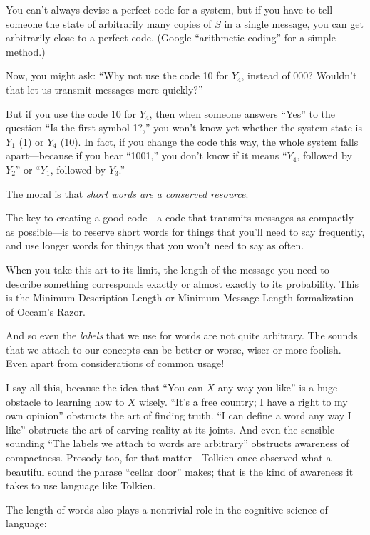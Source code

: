 {{{
 You can't always devise a perfect code for a
system, but if you have to tell someone the state of arbitrarily many
copies of $S$ in a single message, you can get arbitrarily close to a
perfect code. (Google ``arithmetic
coding'' for a simple method.)}

{
 Now, you might ask: ``Why not use the code 10 for
$Y_{4}$, instead of 000? Wouldn't that let
us transmit messages more quickly?''}

{
 But if you use the code 10 for $Y_{4}$, then when
someone answers ``Yes'' to the
question ``Is the first symbol 1?,''
you won't know yet whether the system state is
$Y_{1}$ (1) or $Y_{4}$ (10). In fact, if you
change the code this way, the whole system falls apart---because if you
hear ``1001,'' you
don't know if it means
``$Y_{4}$, followed by
$Y_{2}$'' or
``$Y_{1}$, followed by
$Y_{3}$.''}

{
 The moral is that \textit{short words are a conserved resource}.}

{
 The key to creating a good code---a code that transmits messages
as compactly as possible---is to reserve short words for things that
you'll need to say frequently, and use longer words for
things that you won't need to say as often.}

{
 When you take this art to its limit, the length of the message you
need to describe something corresponds exactly or almost exactly to its
probability. This is the Minimum Description Length or Minimum Message
Length formalization of Occam's Razor.}

{
 And so even the \textit{labels} that we use for words are not
quite arbitrary. The sounds that we attach to our concepts can be
better or worse, wiser or more foolish. Even apart from considerations
of common usage!}

{
 I say all this, because the idea that ``You can $X$
any way you like'' is a huge obstacle to learning how
to $X$ wisely. ``It's a free country; I
have a right to my own opinion'' obstructs the art of
finding truth. ``I can define a word any way I
like'' obstructs the art of carving reality at its
joints. And even the sensible-sounding ``The labels we
attach to words are arbitrary'' obstructs awareness
of compactness. Prosody too, for that matter---Tolkien once observed
what a beautiful sound the phrase ``cellar
door'' makes; that is the kind of awareness it takes
to use language like Tolkien.}

{
 The length of words also plays a nontrivial role in the cognitive
science of language:}

}}
